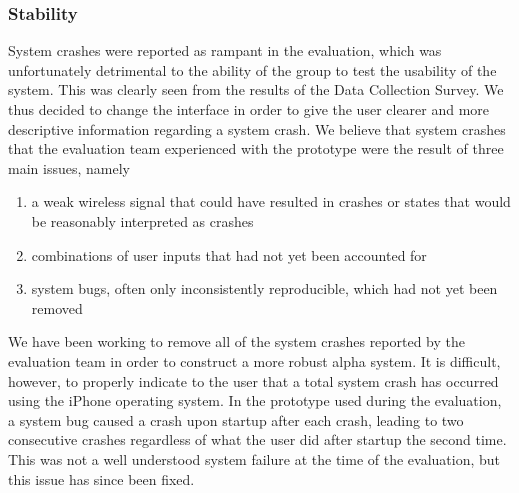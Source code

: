 \documentclass[10pt,letterpaper]{article}
\begin{document}
\subsubsection*{Stability}
System crashes were reported as rampant in the evaluation, which was unfortunately detrimental to the ability of the group to test the usability of the system. This was clearly seen from the results of the Data Collection Survey. We thus decided to change the interface in order to give the user clearer and more descriptive information regarding a system crash. We believe that system crashes that the evaluation team experienced with the prototype were the result of three main issues, namely
	\begin{enumerate}
	\item
	a weak wireless signal that could have resulted in crashes or states that would be reasonably interpreted as crashes
	\item
	combinations of user inputs that had not yet been accounted for
	\item
	system bugs, often only inconsistently reproducible, which had not yet been removed
	\end{enumerate}
We have been working to remove all of the system crashes reported by the evaluation team in order to construct a more robust alpha system. It is difficult, however, to properly indicate to the user that a total system crash has occurred using the iPhone operating system. In the prototype used during the evaluation, a system bug caused a crash upon startup after each crash, leading to two consecutive crashes regardless of what the user did after startup the second time. This was not a well understood system failure at the time of the evaluation, but this issue has since been fixed.
\end{document}
